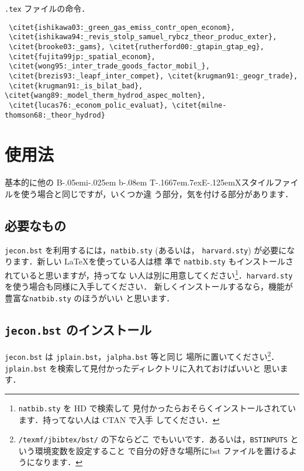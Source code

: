 \documentclass[a4j,10pt]{jarticle}
\def\BibTeX{{\rm B\kern-.05em{\sc i\kern-.025em b}\kern-.08em
    T\kern-.1667em\lower.7ex\hbox{E}\kern-.125emX}}
\begin{document}
\texttt{.tex} ファイルの命令．

\begin{screen}
\begin{verbatim}
 \citet{ishikawa03:_green_gas_emiss_contr_open_econom},
 \citet{ishikawa94:_revis_stolp_samuel_rybcz_theor_produc_exter},
 \citet{brooke03:_gams}, \citet{rutherford00:_gtapin_gtap_eg},
 \citet{fujita99jp:_spatial_econom},
 \citet{wong95:_inter_trade_goods_factor_mobil_},
 \citet{brezis93:_leapf_inter_compet}, \citet{krugman91:_geogr_trade},
 \citet{krugman91:_is_bilat_bad}, \citet{wang89:_model_therm_hydrod_aspec_molten},
 \citet{lucas76:_econom_polic_evaluat}, \citet{milne-thomson68:_theor_hydrod}
\end{verbatim}
\end{screen}


\section{使用法}

基本的に他の \BibTeX スタイルファイルを使う場合と同じですが，いくつか違
う部分，気を付ける部分があります．

\subsection{必要なもの}

\texttt{jecon.bst} を利用するには，\texttt{natbib.sty} (あるいは，
\texttt{harvard.sty}) が必要になります．新しい \LaTeX を使っている人は標
準で \texttt{natbib.sty} もインストールされていると思いますが，持ってな
い人は別に用意してください\footnote{\texttt{natbib.sty} を HD で検索して
見付かったらおそらくインストールされています．持ってない人は CTAN で入手
してください．}．\texttt{harvard.sty} を使う場合も同様に入手してください．
新しくインストールするなら，機能が豊富な\texttt{natbib.sty} のほうがいい
と思います．


\subsection{\texttt{jecon.bst} のインストール}

\texttt{jecon.bst} は \texttt{jplain.bst}，\texttt{jalpha.bst} 等と同じ
場所に置いてください\footnote{\texttt{/texmf/jbibtex/bst/} の下ならどこ
でもいいです．あるいは，\texttt{BSTINPUTS} という環境変数を設定すること
で自分の好きな場所にbst ファイルを置けるようになります．}．
\texttt{jplain.bst} を検索して見付かったディレクトリに入れておけばいいと
思います．
\end{document}
